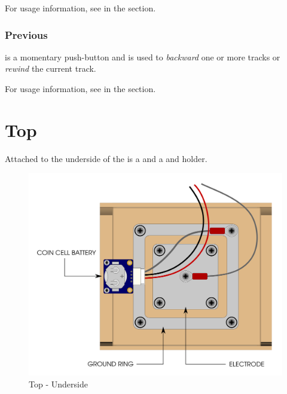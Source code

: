 \par\medskip

For usage information, see \hyperref[Audio - Next]{} in the
\hyperref[Audio]{} section.

\subsection{Previous} \label{Previous}

 is a momentary push-button and is used to  \textit{backward}
one or more tracks or \textit{rewind} the current track.

\par\medskip

For usage information, see \hyperref[Audio - Previous]{} in the
\hyperref[Audio]{} section.

\chapter{Top} \label{Top}

Attached to the underside of the  is a  and a  and holder.

\begin{figure}[H]
\centering
  \includegraphics{images/top.png}
\caption{Top - Underside}
\end{figure}

